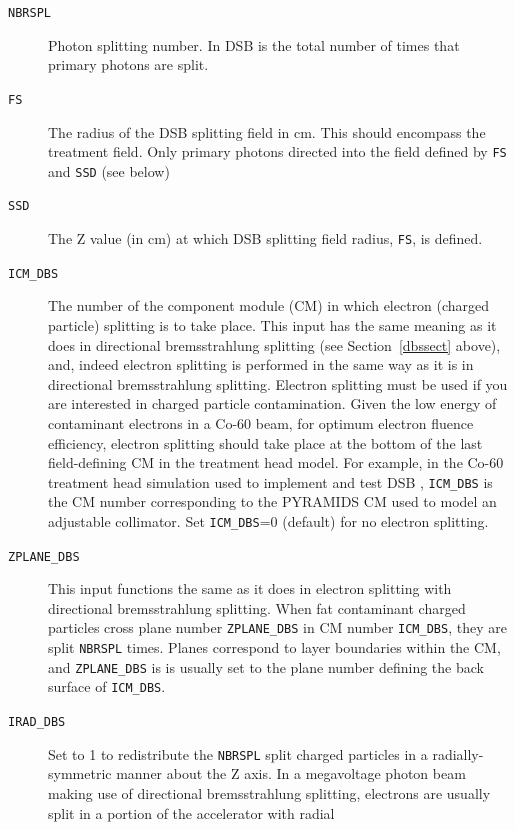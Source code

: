 \documentclass[12pt,twoside]{article}
\begin{document}
\begin{description}
\item [{\tt NBRSPL}] Photon splitting number.  In DSB is the total number of times that primary
photons are split.
\item [{\tt FS}]  The radius of the DSB splitting field in cm.  This should encompass the
treatment field.  Only primary photons directed into the field defined by {\tt FS} and {\tt SSD} (see below)
\item [{\tt SSD}]  The Z value (in cm)
at which DSB splitting field radius, {\tt FS}, is defined.
\item [{\tt ICM\_DBS}] The number of the component module (CM) in which
electron (charged particle) splitting is to take place.  This input has the same
meaning as it does in directional bremsstrahlung splitting (see Section~\ref{dbssect} above), and, indeed
electron splitting is performed in the same way as it is in directional bremsstrahlung splitting.  Electron
splitting must be used if you are interested in charged particle contamination.  Given the low energy
of contaminant electrons in a Co-60 beam, for optimum electron
fluence efficiency, electron splitting should take place at the bottom of the last field-defining
CM in the treatment head model.  For example, in the Co-60 treatment head simulation used to implement
and test DSB \cite{Wa15}, {\tt ICM\_DBS} is the CM number corresponding to the PYRAMIDS CM used to model an
adjustable collimator.
Set {\tt ICM\_DBS}=0 (default) for no electron splitting.
\item [{\tt ZPLANE\_DBS}] This input functions the same as it does in electron splitting with
directional bremsstrahlung splitting.
When fat contaminant charged particles cross plane number {\tt ZPLANE\_DBS} in CM number {\tt ICM\_DBS}, they are split
{\tt NBRSPL} times.
Planes correspond to layer boundaries within the CM, and {\tt ZPLANE\_DBS} is is usually set to the plane number
defining the back surface of {\tt ICM\_DBS}.
\item [{\tt IRAD\_DBS}] Set to 1 to redistribute the {\tt NBRSPL} split
charged particles in a radially-symmetric manner about the Z axis.  In a megavoltage photon beam making use of
directional bremsstrahlung splitting, electrons are usually split in a portion of the accelerator with radial

\end{description}
\end{document}
